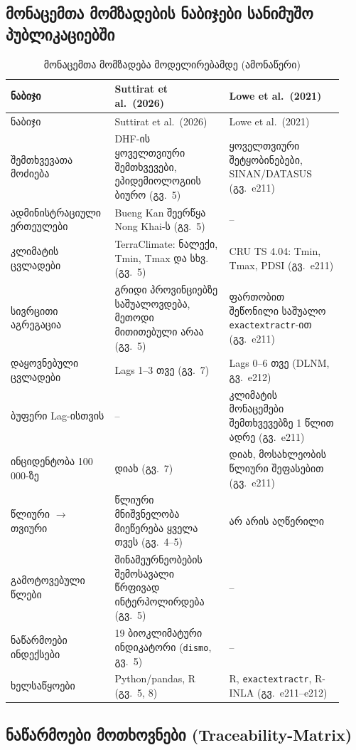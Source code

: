\documentclass[11pt,a4paper]{article}
\begin{document}
\subsection{მონაცემთა მომზადების ნაბიჯები სანიმუშო პუბლიკაციებში}

\begin{longtable}{@{}p{0.27\linewidth}p{0.33\linewidth}p{0.33\linewidth}@{}}
\caption{მონაცემთა მომზადება მოდელირებამდე (ამონაწერი)}\label{tab:steps_ka}\\
\toprule
ნაბიჯი & Suttirat et al.\ (2026) & Lowe et al.\ (2021) \\
\midrule
\endfirsthead
\toprule
ნაბიჯი & Suttirat et al.\ (2026) & Lowe et al.\ (2021) \\
\midrule
\endhead
შემთხვევათა მოძიება & DHF-ის ყოველთვიური შემთხვევები, ეპიდემიოლოგიის ბიურო (გვ.~5) &
  ყოველთვიური შეტყობინებები, SINAN/DATASUS (გვ.~e211) \\
ადმინისტრაციული ერთეულები & Bueng Kan შეერწყა Nong Khai-ს (გვ.~5) & -- \\
კლიმატის ცვლადები & TerraClimate: ნალექი, Tmin, Tmax და სხვ. (გვ.~5) &
  CRU TS 4.04: Tmin, Tmax, PDSI (გვ.~e211) \\
სივრცითი აგრეგაცია & გრიდი პროვინციებზე საშუალოვდება, მეთოდი მითითებული არაა (გვ.~5) &
  ფართობით შეწონილი საშუალო \texttt{exactextractr}-ით (გვ.~e211) \\
დაყოვნებული ცვლადები & Lags 1--3 თვე (გვ.~7) & Lags 0--6 თვე (DLNM, გვ.~e212) \\
ბუფერი Lag-ისთვის & -- & კლიმატის მონაცემები შემთხვევებზე 1 წლით ადრე (გვ.~e211) \\
ინციდენტობა 100\,000-ზე & დიახ (გვ.~7) & დიახ, მოსახლეობის წლიური შეფასებით (გვ.~e211) \\
წლიური $\rightarrow$ თვიური & წლიური მნიშვნელობა მიეწერება ყველა თვეს (გვ.~4--5) &
  არ არის აღწერილი \\
გამოტოვებული წლები & შინამეურნეობების შემოსავალი წრფივად ინტერპოლირდება (გვ.~5) & -- \\
ნაწარმოები ინდექსები & 19 ბიოკლიმატური ინდიკატორი (\texttt{dismo}, გვ.~5) & -- \\
ხელსაწყოები & Python/pandas, R (გვ.~5, 8) & R, \texttt{exactextractr}, R-INLA (გვ.~e211--e212) \\
\bottomrule
\end{longtable}

\subsection{ნაწარმოები მოთხოვნები (Traceability-Matrix)}
\end{document}
